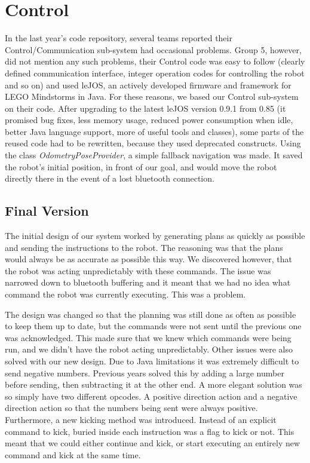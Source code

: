 \section{Control}
In the last year's code repository, several teams reported their Control/Communication 
sub-system had occasional problems. Group 5, however, did not mention any such problems, 
their Control code was easy to follow (clearly defined communication interface, integer 
operation codes for controlling the robot and so on) and used leJOS, an actively 
developed firmware and framework for LEGO Mindstorms in Java. For these reasons, we based 
our Control sub-system on their code. After upgrading to the latest leJOS version 0.9.1 
from 0.85 (it promised bug fixes, less memory usage, reduced power consumption when idle, 
better Java language support, more of useful tools and classes\cite{lejos}), some parts 
of the reused code had to be rewritten, because they used deprecated constructs. Using 
the class \textit{OdometryPoseProvider}, a simple fallback navigation was made. It saved 
the robot's initial position, in front of our goal, and would move the robot directly 
there in the event of a lost bluetooth connection.
\subsection{Final Version}

The initial design of our system worked by generating plans as quickly as possible and 
sending the instructions to the robot. The reasoning was that the plans would always be 
as accurate as possible this way. We discovered however, that the robot was acting 
unpredictably with these commands. The issue was narrowed down to bluetooth buffering 
and it meant that we had no idea what command the robot was currently executing. 
This was a problem.

The design was changed so that the planning was still done as often as possible to keep 
them up to date, but the commands were not sent until the previous one was acknowledged. 
This made sure that we knew which commands were being run, and we didn't have the robot 
acting unpredictably. Other issues were also solved with our new design. Due to Java 
limitations it was extremely difficult to send negative numbers. Previous years solved 
this by adding a large number before sending, then subtracting it at the other end. 
A more elegant solution was so simply have two different opcodes. A positive direction 
action and a negative direction action so that the numbers being sent were always 
positive. Furthermore, a new kicking method was introduced. Instead of an explicit 
command to kick, buried inside each instruction was a flag to kick or not. This meant 
that we could either continue and kick, or start executing an entirely new command and 
kick at the same time. 

